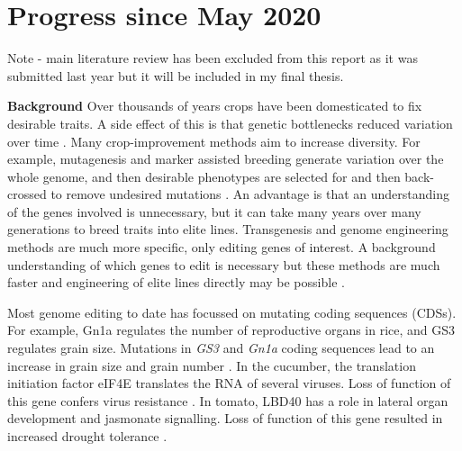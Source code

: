 \documentclass[../main.tex]{subfiles}
\begin{document}
\chapter{Progress since May 2020}\label{progress}
Note - main literature review has been excluded from this report as it was submitted last year but it will be included in my final thesis.

\textbf{Background}
Over thousands of years crops have been domesticated to fix desirable traits.
A side effect of this is that genetic bottlenecks reduced variation over time \autocite{tanksleySeedBanksMolecular1997}.
Many crop\hyp{}improvement methods aim to increase diversity.
For example, mutagenesis and marker assisted breeding generate variation over the whole genome, and then desirable phenotypes are selected for and then back\hyp{}crossed to remove undesired mutations \autocite{tuberosaMarkerAssistedbreddingBreedSee2012}.
An advantage is that an understanding of the genes involved is unnecessary, but it can take many years over many generations to breed traits into elite lines.
Transgenesis and genome engineering methods are much more specific, only editing genes of interest.
A background understanding of which genes to edit is necessary but these methods are much faster and engineering of elite lines directly may be possible \autocite{sedeekPlantGenomeEngineering2019}.

Most genome editing to date has focussed on mutating coding sequences (CDSs).
For example, Gn1a regulates the number of reproductive organs in rice, and GS3 regulates grain size.
Mutations in \textit{GS3} and \textit{Gn1a} coding sequences lead to an increase in grain size and grain number \autocite{shenQTLEditingConfers2018}.
In the cucumber, the translation initiation factor eIF4E translates the RNA of several viruses.
Loss of function of this gene confers virus resistance \autocite{chandrasekaranDevelopmentBroadVirus2016}.
In tomato, LBD40 has a role in lateral organ development and jasmonate signalling.
Loss of function of this gene resulted in increased drought tolerance \autocite{liuCRISPRCas9Targeted2020}.
\end{document}
